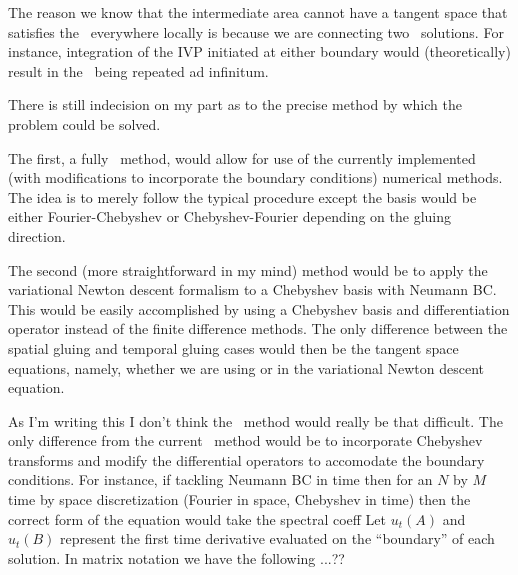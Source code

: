 \begin{description}
{The reason we know that the intermediate area
cannot have a tangent space that satisfies the \KSe\
everywhere locally is because we are connecting two
\twot\ solutions. For instance, integration of the
IVP initiated at either boundary would (theoretically)
result in the \twot\ being repeated ad infinitum.

There is still indecision on my part as to the
precise method by which the problem could be solved.

The first, a fully \spt\ method, would allow for
use of the currently implemented (with modifications
to incorporate the boundary conditions) numerical
methods. The idea is to merely follow the typical
procedure except the basis would be either Fourier-Chebyshev
or Chebyshev-Fourier depending on the gluing direction.

The second (more straightforward in my mind) method
would be to apply the variational Newton descent formalism
to a Chebyshev basis with Neumann BC. This would be
easily accomplished by using a Chebyshev basis and
differentiation operator instead of the finite difference
methods. The only difference between the spatial gluing
and temporal gluing cases would then be
the tangent space equations,
namely, whether we are using  or 
in the variational Newton descent equation.

As I'm writing this I don't think the \spt\ method would
really be that difficult. The only difference from the
current \spt\ method would be to incorporate Chebyshev
transforms and modify the differential
operators to accomodate the boundary conditions.
For instance, if tackling Neumann BC
in time then for an $N$ by $M$ time by space discretization
(Fourier in space, Chebyshev in time) then the
correct form of the equation would take the spectral
coeff
Let $u_t(A)$ and $u_t(B)$ represent the first time
derivative evaluated on the ``boundary'' of each solution.
In matrix notation we have the following
...??
}


\end{description}

